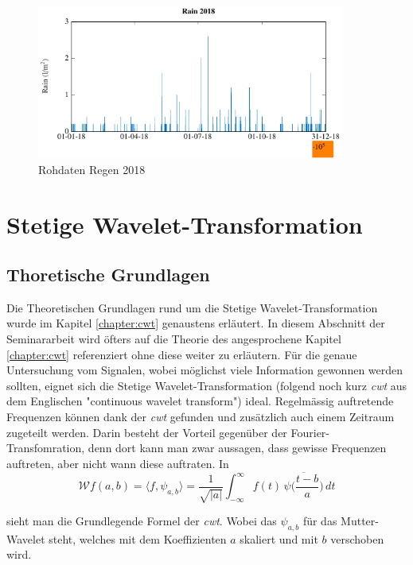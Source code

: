\begin{refsection}
\begin{figure}[h]
	\includegraphics[width=0.9\textwidth]{papers/wwt/images/raw_rain_wwt.pdf}
	\caption{Rohdaten Regen 2018}
	\label{fig:rawdata_wind_rain}
\end{figure}

\newpage
\section{Stetige Wavelet-Transformation}
\subsection{Thoretische Grundlagen}
Die Theoretischen Grundlagen rund um die Stetige Wavelet-Transformation wurde im Kapitel \ref{chapter:cwt} genaustens erläutert. 
In diesem Abschnitt der Seminararbeit wird öfters auf die Theorie des angesprochene Kapitel \ref{chapter:cwt} referenziert ohne diese weiter zu erläutern. 
Für die genaue Untersuchung vom Signalen, wobei möglichst viele Information gewonnen werden sollten, eignet sich die Stetige Wavelet-Transformation (folgend noch kurz \textit{cwt} aus dem Englischen "continuous wavelet transform")
ideal. 
Regelmässig auftretende Frequenzen können dank der \textit{cwt} gefunden und zusätzlich auch einem Zeitraum zugeteilt werden.
Darin besteht der Vorteil gegenüber der Fourier-Transfomration, denn dort kann man zwar aussagen, dass gewisse Frequenzen auftreten, aber nicht wann diese auftraten.
In 
\begin{equation}
\mathcal{W}f (a,b)
=
\langle f,\psi_{a,b}\rangle
=
\frac{1}{\sqrt{|a|}}\int_{-\infty}^\infty f(t)\,\overline{
	\psi\biggl(\frac{t-b}{a}\biggr)}\,dt
\label{eq:cwt}
\end{equation}

sieht man die Grundlegende Formel der \textit{cwt}. Wobei das $\psi_{a,b}$ für das Mutter-Wavelet steht, welches mit dem Koeffizienten $a$ skaliert und mit $b$ verschoben wird.


\end{refsection}
